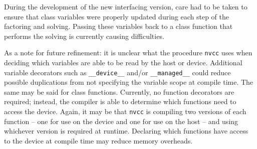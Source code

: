 \documentclass[11pt,letterpaper]{article}
\begin{document}
During the development of the new interfacing version, care had to be taken to ensure that class variables were properly updated during each step of the factoring and solving. Passing these variables back to a class function that performs the solving is currently causing difficulties.

As a note for future refinement: it is unclear what the procedure \verb+nvcc+ uses when deciding which variables are able to be read by the host or device. Additional variable decorators such as \verb+__device__+ and/or \verb+__managed__+ could reduce possible duplications from not specifying the variable scope at compile time. The same may be said for class functions. Currently, no function decorators are required; instead, the compiler is able to determine which functions need to access the device. Again, it may be that \verb+nvcc+ is compiling two versions of each function -- one for use on the device and one for use on the host -- and using whichever version is required at runtime. Declaring which functions have access to the device at compile time may reduce memory overheads.


\end{document}
